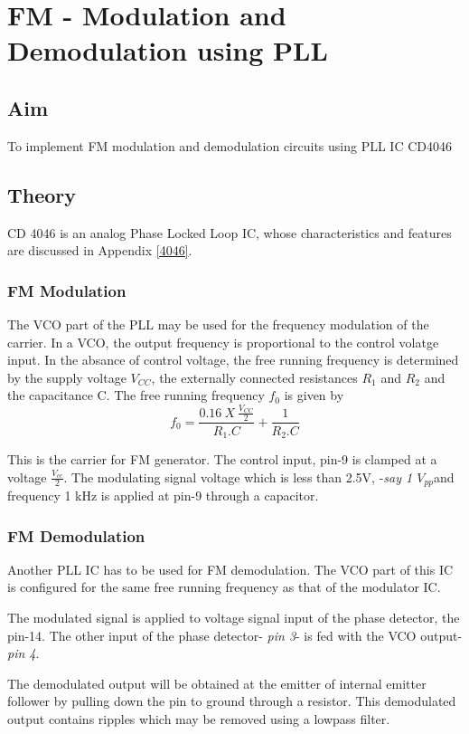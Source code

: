 \chapter[FM - Modulation and Demodulation using PLL]{FM - Modulation and Demodulation using PLL}
\section*{Aim}
To implement FM modulation and demodulation circuits using PLL IC CD4046
\section*{Theory}
CD 4046 is an analog Phase Locked Loop IC, whose characteristics and features are discussed in Appendix \ref{4046}. 
\subsection*{FM Modulation}

The VCO part of the PLL may be used for the frequency modulation of the carrier. In a VCO, the output frequency is proportional to the control volatge input. In the absance of control voltage, the free running frequency is determined by the supply voltage $V_{CC}$, the externally connected resistances $R_1$ and $R_2$ and the capacitance C. The free running frequency $f_0$ is given by 
\begin{equation}
\label{f0}
f_0=\frac{0.16\ X\ \frac{V_{CC}}{2} }{R_1.C}+\frac{1}{R_2.C}
\end{equation}

This is the carrier for FM generator. The control input, pin-9 is clamped at a voltage $\frac{V_{cc}}{2}$. The modulating signal voltage which is less than 2.5V, -\emph{say 1 $V_{pp}$}and frequency 1 kHz is applied at pin-9 through a capacitor.

\subsection*{FM Demodulation}
Another PLL IC has to be used for FM demodulation. The VCO part of this IC is configured for the same free running frequency as that of the modulator IC. 

The modulated signal is applied to voltage signal input of the phase detector, the pin-14. The other input of the phase detector- \emph{pin 3}- is fed with the VCO output- \emph{pin 4}. 

 The demodulated output will be obtained at the emitter of internal emitter follower by pulling down the pin to ground through a resistor. This demodulated output contains ripples which may be removed using a lowpass filter.
